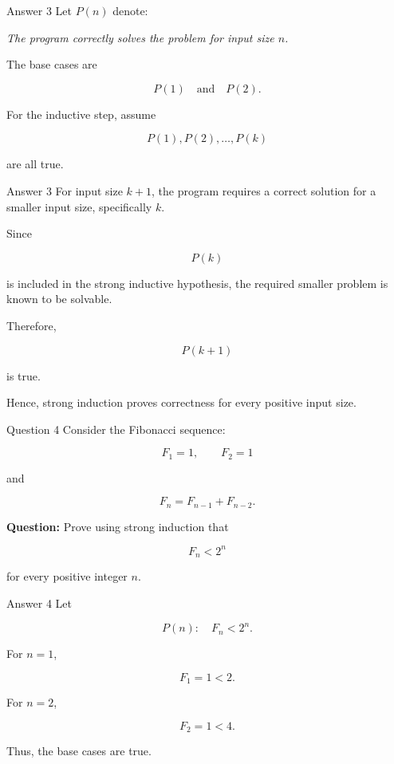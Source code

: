 \begin{frame}{Answer 3}
Let $P(n)$ denote:

\textit{The program correctly solves the problem for input size $n$.}

The base cases are

$$
P(1)
\quad\text{and}\quad
P(2).
$$

For the inductive step, assume

$$
P(1),P(2),\ldots,P(k)
$$

are all true.
\end{frame}

\begin{frame}{Answer 3}
For input size $k+1$, the program requires a correct solution for a smaller input size, specifically $k$.

Since

$$
P(k)
$$

is included in the strong inductive hypothesis, the required smaller problem is known to be solvable.

Therefore,

$$
P(k+1)
$$

is true.

Hence, strong induction proves correctness for every positive input size.
\end{frame}


\begin{frame}{Question 4}
Consider the Fibonacci sequence:

$$
F_1=1,\qquad F_2=1
$$

and

$$
F_n=F_{n-1}+F_{n-2}.
$$

\textbf{Question:} Prove using strong induction that

$$
F_n<2^n
$$

for every positive integer $n$.
\end{frame}

\begin{frame}{Answer 4}
Let

$$
P(n):\quad F_n<2^n.
$$

For $n=1$,

$$
F_1=1<2.
$$

For $n=2$,

$$
F_2=1<4.
$$

Thus, the base cases are true.
\end{frame}

